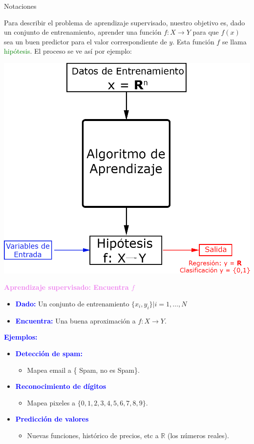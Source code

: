 \documentclass[11pt]{beamer}
\begin{document}
\begin{frame}{\textcolor{green!35!blue}{Notaciones}}
	
\small{Para describir el problema de aprendizaje supervisado, nuestro objetivo es, dado un conjunto de entrenamiento, aprender una funci\'on $f: X \rightarrow Y$ para que $f(x)$ sea un buen predictor  para el valor correspondiente de $y$. Esta funci\'on $f$ se llama \textcolor{green}{hip\'otesis}. El proceso se ve as\'i por ejemplo:
	
	\begin{center}
		\includegraphics[width=0.42 \textwidth]{ML19.png}	
	\end{center}}
\end{frame}


\begin{frame}{\textbf{\textcolor{violet}{Aprendizaje supervisado: Encuentra $f$}}}
	
\begin{itemize}
	\item \textbf{\textcolor{blue}{Dado:}} Un conjunto de entrenamiento $\{ x_i, y_i	\}|i = 1, \dots, N$
	\item \textbf{\textcolor{blue}{Encuentra:}} Una buena aproximaci\'on a $f: X \rightarrow Y$.
\end{itemize}

\vspace{0.3cm}

 \textbf{\textcolor{blue}{Ejemplos:}}
 
 \begin{itemize}
 	\item \textbf{\textcolor{blue}{Detecci\'on de spam:}}
 	\begin{itemize}
 		\item Mapea email a \{ Spam, no es Spam\}.
 	\end{itemize}
 	\item \textbf{\textcolor{blue}{Reconocimiento de d\'igitos}}
 	\begin{itemize}
 		\item  Mapea pixeles a $\{0,1, 2,3,4,5,6,7,8,9\}$.
 	\end{itemize}
 	\item \textbf{\textcolor{blue}{Predicci\'on de valores}}
 	\begin{itemize}
 		\item   Nuevas funciones, hist\'orico de precios, etc a $\mathbb{R}$ (los n\'umeros reales).
 	\end{itemize}
 \end{itemize}
\end{frame}
\end{document}

